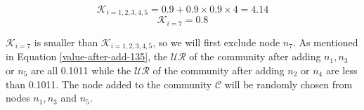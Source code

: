 \documentclass[\main/thesis.tex]{subfiles}
\begin{document}
\begin{equation}
\mathcal{K}_{i=1,2,3,4,5}=0.9+0.9\times0.9\times4=4.14
\end{equation}
\begin{equation}
\mathcal{K}_{i=7}=0.8
\end{equation}

$\mathcal{K}_{i=7}$ is smaller than $\mathcal{K}_{i=1,2,3,4,5}$, so we will first exclude node $n_7$. As mentioned in Equation \ref{value-after-add-135}, the $\mathcal{UR}$ of the community after adding $n_1, n_3$ or $n_5$ are all 0.1011 while the $\mathcal{UR}$ of the community after adding $n_2$ or $n_4$ are less than 0.1011. The node added to the community $\mathcal{C}$ will be randomly chosen from nodes $n_1, n_3$ and $n_5$.




\end{document}
